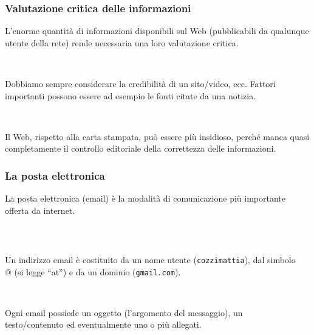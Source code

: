 \documentclass[]{beamer}
\begin{document}
\begin{frame}
\frametitle{Valutazione critica delle informazioni}
L'enorme quantità di informazioni disponibili sul Web (pubblicabili da qualunque utente della rete) rende necessaria una loro \alert<1>{valutazione critica}.\pause

~

Dobbiamo sempre considerare la \alert<2>{credibilità} di un sito/video, ecc. Fattori importanti possono essere ad esempio le fonti citate da una notizia.\pause

~

Il Web, rispetto alla carta stampata, può essere più insidioso, perché manca quasi completamente il controllo editoriale della correttezza delle informazioni.
\end{frame}


\begin{frame}
\frametitle{La posta elettronica}
La posta elettronica (\alert<1>{email}) è la modalità di comunicazione più importante offerta da internet.\pause

~

\begin{columns}
  \begin{column}{0.55\textwidth}
  Un indirizzo email è costituito da un nome utente (\texttt{cozzimattia}), dal simbolo $@$ (si legge ``at'') e da un dominio (\texttt{gmail.com}).\pause

   ~
   
   Ogni email possiede un \alert<3>{oggetto} (l'argomento del messaggio), un \alert<3>{testo/contenuto} ed eventualmente uno o più \alert<3>{allegati}.
  \end{column}
  \begin{column}{0.37\textwidth}
  \end{column}
\end{columns}
\end{frame}
\end{document}
